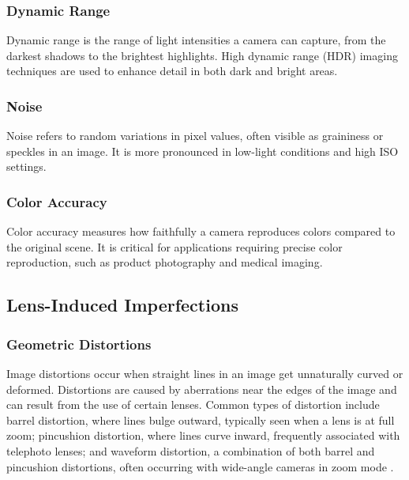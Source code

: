 \subsubsection{Dynamic Range}
Dynamic range is the range of light intensities a camera can capture, from the darkest shadows to the brightest highlights. High dynamic range (HDR) imaging techniques are used to enhance detail in both dark and bright areas.

\subsubsection{Noise}
Noise refers to random variations in pixel values, often visible as graininess or speckles in an image. It is more pronounced in low-light conditions and high ISO settings.

\subsubsection{Color Accuracy}
Color accuracy measures how faithfully a camera reproduces colors compared to the original scene. It is critical for applications requiring precise color reproduction, such as product photography and medical imaging.

\subsection{Lens-Induced Imperfections}

\subsubsection{Geometric Distortions}
Image distortions occur when straight lines in an image get unnaturally curved or deformed. Distortions are caused by aberrations near the edges of the image and can result from the use of certain lenses. Common types of distortion include barrel distortion, where lines bulge outward, typically seen when a lens is at full zoom; pincushion distortion, where lines curve inward, frequently associated with telephoto lenses; and waveform distortion, a combination of both barrel and pincushion distortions, often occurring with wide-angle cameras in zoom mode \cite{distortions}.

